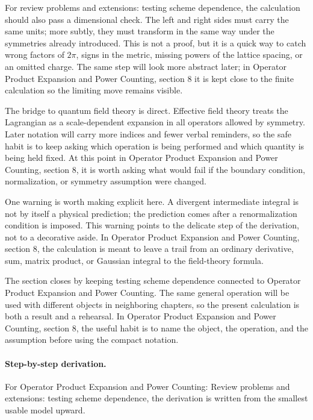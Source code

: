 For review problems and extensions: testing scheme dependence, the calculation should also pass a dimensional check.  The left and right sides must carry the same units; more subtly, they must transform in the same way under the symmetries already introduced.  This is not a proof, but it is a quick way to catch wrong factors of \(2\pi\), signs in the metric, missing powers of the lattice spacing, or an omitted charge.  The same step will look more abstract later; in Operator Product Expansion and Power Counting, section 8 it is kept close to the finite calculation so the limiting move remains visible.

The bridge to quantum field theory is direct.  Effective field theory treats the Lagrangian as a scale-dependent expansion in all operators allowed by symmetry.  Later notation will carry more indices and fewer verbal reminders, so the safe habit is to keep asking which operation is being performed and which quantity is being held fixed.  At this point in Operator Product Expansion and Power Counting, section 8, it is worth asking what would fail if the boundary condition, normalization, or symmetry assumption were changed.

One warning is worth making explicit here.  A divergent intermediate integral is not by itself a physical prediction; the prediction comes after a renormalization condition is imposed.  This warning points to the delicate step of the derivation, not to a decorative aside.  In Operator Product Expansion and Power Counting, section 8, the calculation is meant to leave a trail from an ordinary derivative, sum, matrix product, or Gaussian integral to the field-theory formula.

The section closes by keeping testing scheme dependence connected to Operator Product Expansion and Power Counting.  The same general operation will be used with different objects in neighboring chapters, so the present calculation is both a result and a rehearsal.  In Operator Product Expansion and Power Counting, section 8, the useful habit is to name the object, the operation, and the assumption before using the compact notation.



\paragraph{Step-by-step derivation.}

For Operator Product Expansion and Power Counting: Review problems and extensions: testing scheme dependence, the derivation is written from the smallest usable model upward.

